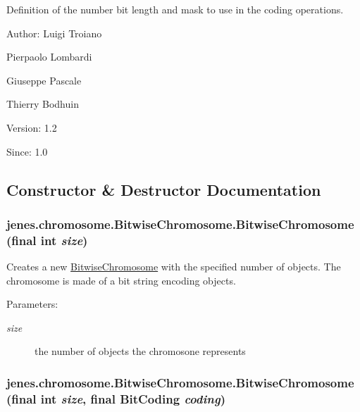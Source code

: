 Definition of the number bit length and mask to use in the coding operations.

\begin{Desc}
\item[Author:]Luigi Troiano 

Pierpaolo Lombardi 

Giuseppe Pascale 

Thierry Bodhuin\end{Desc}
\begin{Desc}
\item[Version:]1.2\end{Desc}
\begin{Desc}
\item[Since:]1.0 \end{Desc}


\subsection{Constructor \& Destructor Documentation}
\hypertarget{classjenes_1_1chromosome_1_1_bitwise_chromosome_87547c87419943bded51820cbc1ae830}{
\subsubsection[BitwiseChromosome]{\setlength{\rightskip}{0pt plus 5cm}jenes.chromosome.BitwiseChromosome.BitwiseChromosome (final int {\em size})}}
\label{classjenes_1_1chromosome_1_1_bitwise_chromosome_87547c87419943bded51820cbc1ae830}


Creates a new \hyperlink{classjenes_1_1chromosome_1_1_bitwise_chromosome}{BitwiseChromosome} with the specified number of objects. The chromosome is made of a bit string encoding objects.

\begin{Desc}
\item[Parameters:]
\begin{description}
\item[{\em size}]the number of objects the chromosone represents \end{description}
\end{Desc}
\hypertarget{classjenes_1_1chromosome_1_1_bitwise_chromosome_9109a8205e447db9032f29494f0d9b3d}{
\subsubsection[BitwiseChromosome]{\setlength{\rightskip}{0pt plus 5cm}jenes.chromosome.BitwiseChromosome.BitwiseChromosome (final int {\em size}, \/  final BitCoding {\em coding})}}
\label{classjenes_1_1chromosome_1_1_bitwise_chromosome_9109a8205e447db9032f29494f0d9b3d}


